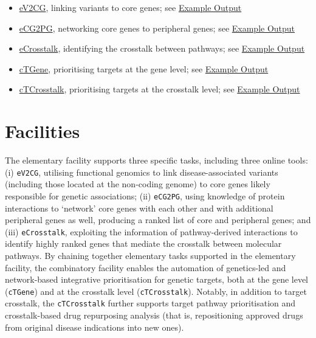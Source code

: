 \documentclass[
  oneside]{book}
\begin{document}
\begin{itemize}
\item
  \protect\hyperlink{ev2cg}{eV2CG}, linking variants to core genes; see \href{http://www.genetictargets.com/app/examples/_tmp_RMD_eV2CG.html}{Example Output}
\item
  \protect\hyperlink{ecg2pg}{eCG2PG}, networking core genes to peripheral genes; see \href{http://www.genetictargets.com/app/examples/_tmp_RMD_eCG2PG.html}{Example Output}
\item
  \protect\hyperlink{ecrosstalk}{eCrosstalk}, identifying the crosstalk between pathways; see \href{http://www.genetictargets.com/app/examples/_tmp_RMD_eCrosstalk.html}{Example Output}
\item
  \protect\hyperlink{ctgene}{cTGene}, prioritising targets at the gene level; see \href{http://www.genetictargets.com/app/examples/_tmp_RMD_cTGene.html}{Example Output}
\item
  \protect\hyperlink{ctcrosstalk}{cTCrosstalk}, prioritising targets at the crosstalk level; see \href{http://www.genetictargets.com/app/examples/_tmp_RMD_cTCrosstalk.html}{Example Output}
\end{itemize}

\hypertarget{facilities}{%
\chapter{Facilities}\label{facilities}}

The elementary facility supports three specific tasks, including three online tools: (i) \texttt{eV2CG}, utilising functional genomics to link disease-associated variants (including those located at the non-coding genome) to core genes likely responsible for genetic associations; (ii) \texttt{eCG2PG}, using knowledge of protein interactions to `network' core genes with each other and with additional peripheral genes as well, producing a ranked list of core and peripheral genes; and (iii) \texttt{eCrosstalk}, exploiting the information of pathway-derived interactions to identify highly ranked genes that mediate the crosstalk between molecular pathways. By chaining together elementary tasks supported in the elementary facility, the combinatory facility enables the automation of genetics-led and network-based integrative prioritisation for genetic targets, both at the gene level (\texttt{cTGene}) and at the crosstalk level (\texttt{cTCrosstalk}). Notably, in addition to target crosstalk, the \texttt{cTCrosstalk} further supports target pathway prioritisation and crosstalk-based drug repurposing analysis (that is, repositioning approved drugs from original disease indications into new ones).
\end{document}
